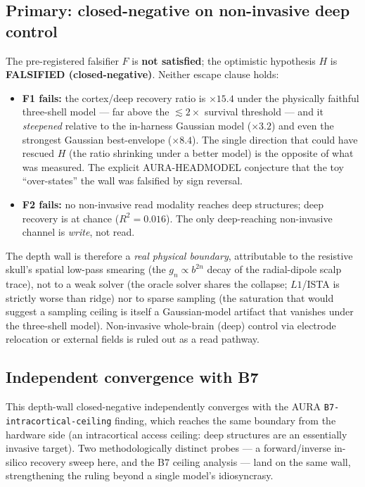 \documentclass[11pt]{article}
\newcommand{\Rsq}{R^{2}}
\newcommand{\redbox}[1]{\textcolor{red!70!black}{\textbf{#1}}}
\begin{document}
\subsection{Primary: closed-negative on non-invasive deep control}
The pre-registered falsifier $F$ is \redbox{not satisfied}; the optimistic
hypothesis $H$ is \redbox{FALSIFIED (closed-negative)}. Neither escape clause holds:
\begin{itemize}[leftmargin=2em]
  \item \textbf{F1 fails:} the cortex/deep recovery ratio is $\times 15.4$ under the
        physically faithful three-shell model --- far above the $\lesssim 2\times$
        survival threshold --- and it \emph{steepened} relative to the in-harness
        Gaussian model ($\times 3.2$) and even the strongest Gaussian best-envelope
        ($\times 8.4$). The single direction that could have rescued $H$ (the ratio
        shrinking under a better model) is the opposite of what was measured. The
        explicit AURA-HEADMODEL conjecture that the toy ``over-states'' the wall was
        falsified by sign reversal.
  \item \textbf{F2 fails:} no non-invasive read modality reaches deep structures;
        deep recovery is at chance ($\Rsq = 0.016$). The only deep-reaching
        non-invasive channel is \emph{write}, not read.
\end{itemize}
The depth wall is therefore a \emph{real physical boundary}, attributable to the
resistive skull's spatial low-pass smearing (the $g_n \propto b^{2n}$ decay of the
radial-dipole scalp trace), not to a weak solver (the oracle solver shares the
collapse; $L1$/ISTA is strictly worse than ridge) nor to sparse sampling (the
saturation that would suggest a sampling ceiling is itself a Gaussian-model artifact
that vanishes under the three-shell model). Non-invasive whole-brain (deep) control
via electrode relocation or external fields is ruled out as a read pathway.

\subsection{Independent convergence with B7}
This depth-wall closed-negative independently converges with the AURA
\texttt{B7-intracortical-ceiling} finding, which reaches the same boundary from the
hardware side (an intracortical access ceiling: deep structures are an essentially
invasive target). Two methodologically distinct probes --- a forward/inverse
in-silico recovery sweep here, and the B7 ceiling analysis --- land on the same wall,
strengthening the ruling beyond a single model's idiosyncrasy.
\end{document}
